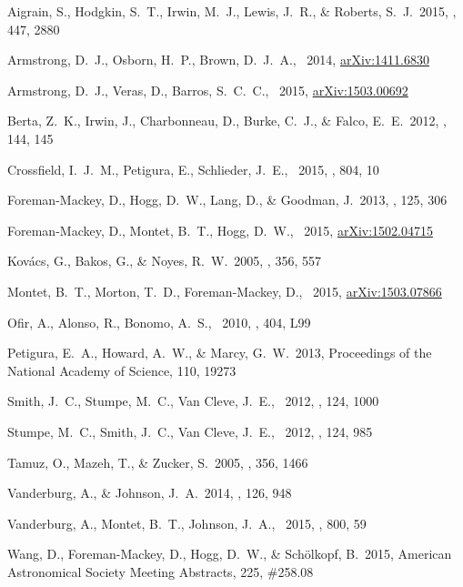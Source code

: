 \documentclass[12pt,preprint]{aastex}
\begin{document}
\clearpage
\newcommand{\arxiv}[1]{{\href{http://arxiv.org/abs/#1}{arXiv:{#1}}}}
\begin{thebibliography}{}\raggedright%

Aigrain, S., Hodgkin, S.~T., Irwin, M.~J., Lewis, J.~R., \& Roberts, S.~J.\
2015, \mnras, 447, 2880

Armstrong, D.~J., Osborn, H.~P., Brown, D.~J.~A., \etal\ 2014,
\arxiv{1411.6830}

Armstrong, D.~J., Veras, D., Barros, S.~C.~C., \etal\ 2015, \arxiv{1503.00692}

Berta, Z.~K., Irwin, J., Charbonneau, D., Burke, C.~J., \& Falco, E.~E.\ 2012,
\aj, 144, 145

Crossfield, I.~J.~M., Petigura, E., Schlieder, J.~E., \etal\ 2015, \apj, 804,
10

 Foreman-Mackey, 
D., Hogg, D.~W., Lang, D., \& Goodman, J.\ 2013, \pasp, 125, 306 

Foreman-Mackey, D., Montet, B.~T., Hogg, D.~W., \etal\ 2015, \arxiv{1502.04715}

Kov{\'a}cs, G., Bakos, G., \& Noyes, R.~W.\ 2005, \mnras, 356, 557

Montet, B.~T., Morton, T.~D., Foreman-Mackey, D., \etal\ 2015,
\arxiv{1503.07866}

Ofir, A., Alonso, R., Bonomo, A.~S., \etal\ 2010, \mnras, 404, L99

Petigura, E.~A., Howard, A.~W., \& Marcy, G.~W.\ 2013,
Proceedings of the National Academy of Science, 110, 19273

Smith, J.~C., Stumpe, M.~C., Van Cleve, J.~E., \etal\ 2012, \pasp, 124, 1000

Stumpe, M.~C., Smith, J.~C., Van Cleve, J.~E., \etal\ 2012, \pasp, 124, 985

Tamuz, O., Mazeh, T., \& Zucker, S.\ 2005, \mnras, 356, 1466

Vanderburg, A., \& Johnson, J.~A.\ 2014, \pasp, 126, 948

Vanderburg, A., Montet, B.~T., Johnson, J.~A., \etal\ 2015, \apj, 800, 59

Wang, D., Foreman-Mackey, D., Hogg, D.~W., \& Sch{\"o}lkopf, B.\ 2015,
American Astronomical Society Meeting Abstracts, 225, \#258.08

\end{thebibliography}
\end{document}
